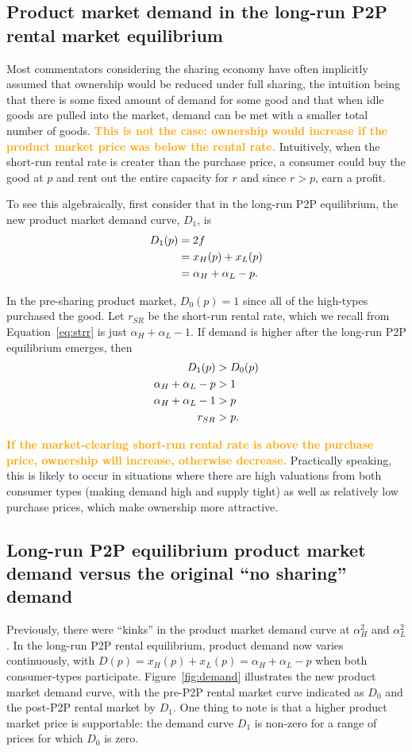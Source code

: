\documentclass[11pt]{article}
\newcommand{\important}[1]{\textcolor{orange}{\textbf{#1}}}
\newcommand{\important}[1]{#1}
\begin{document}
\subsection{Product market demand in the long-run P2P rental market equilibrium} 
Most commentators considering the sharing economy have often implicitly assumed that ownership would be reduced under full sharing, the intuition being that there is some fixed amount of demand for some good and that when idle goods are pulled into the market, demand can be met with a smaller total number of goods. 
\important{This is not the case:  
ownership would increase if the product market price was below the rental rate.} 
Intuitively, when the short-run rental rate is creater than the purchase price, a consumer could buy the good at $p$ and rent out the entire capacity for $r$ and since $r > p$, earn a profit. 

To see this algebraically, first consider that in the long-run P2P equilibrium, the new product market demand curve, $D_1$, is
\begin{align}
D_1(p) &= 2f \notag \\  
     &= x_H(p) + x_L(p) \notag \\ 
     &= \alpha_H + \alpha_L - p.  
\end{align} 

In the pre-sharing product market, $D_0(p) = 1$ since all of the high-types purchased the good. 
Let $r_{SR}$ be the short-run rental rate, which we recall from Equation~\ref{eq:strr} is just $\alpha_H + \alpha_L - 1$. 
If demand is higher after the long-run P2P equilibrium emerges, then  
\begin{align} 
D_{1}(p) & > D_{0}(p) \notag \\
\alpha_H + \alpha_L - p &> 1 \notag \\ 
\alpha_H + \alpha_L - 1 &> p \notag \\ 
r_{SR} &>  p. 
\end{align} 

\important{If the market-clearing short-run rental rate is above the purchase price, ownership will increase, otherwise decrease.}
Practically speaking, this is likely to occur in situations where there are high valuations from both consumer types (making demand high and supply tight) as well as relatively low purchase prices, which make ownership more attractive. 

\subsection{Long-run P2P equilibrium product market demand versus the original ``no sharing'' demand} 
Previously, there were ``kinks'' in the product market demand curve at $\alpha_H^2$ and $\alpha_L^2$. 
In the long-run P2P rental equilibrium, product demand now varies continuously, with $D(p) = x_H(p) + x_L(p) = \alpha_H + \alpha_L - p$ when both consumer-types participate. 
Figure~\ref{fig:demand} illustrates the new product market demand curve, with the pre-P2P rental market curve indicated as $D_0$ and the post-P2P rental market by $D_1$. 
One thing to note is that a higher product market price is supportable: the demand curve $D_1$ is non-zero for a range of prices for which $D_0$ is zero.  
\end{document}
